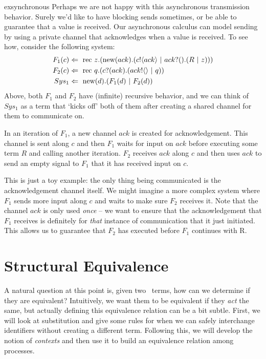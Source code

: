 \begin{example}{exsynchronous}
	 Perhaps we are not happy with this asynchronous transmission behavior.  Surely we'd like to have blocking sends sometimes, or be able to guarantee that a value is received.  Our asynchronous calculus can model  sending by using a private channel that acknowledges when a value is received.  To see how, consider the following system:
	\begin{align}
		F_1(c) & \Leftarrow\  \text{rec }{z}. (\text{new}({ack}).({c}!\langle{ack}\rangle \ |\  {ack}?({}).(R \ |\  z)))\\
		F_2(c) & \Leftarrow\  \text{rec }{q}. ({c}?({ack}).({ack}!\langle{}\rangle \ |\  q)) \\
		Sys_1 & \Leftarrow\  \text{new}({d}).(F_1(d) \ |\  F_2(d))
	\end{align}
	Above, both $F_1$ and $F_2$ have (infinite) recursive behavior, and we can think of $Sys_1$ as a term that `kicks off' both of them after creating a shared channel for them to communicate on.  
	
	In an iteration of $F_1$, a new channel $ack$ is created for acknowledgement.  This channel is sent along $c$ and then $F_1$ waits for input on $ack$ before executing some term $R$ and calling another iteration.  $F_2$ receives $ack$ along $c$ and then uses $ack$ to send an empty signal to $F_1$ that it has received input on $c$.  
	
	This is just a toy example: the only thing being communicated is the acknowledgement channel itself.  We might imagine a more complex system where $F_1$ sends more input along $c$ and waits to make sure $F_2$ receives it.  Note that the channel $ack$ is only used \emph{once} -- we want to ensure that the acknowledgement that $F_1$ receives is definitely for \emph{that} instance of communication that it just initiated.  This allows us to guarantee that $F_2$ has executed before $F_1$ continues with R.  \end{example}

\section{Structural Equivalence}
	A natural question at this point is, given two \picalc\ terms, how can we determine if they are equivalent?  Intuitively, we want them to be equivalent if they \emph{act} the same, but actually defining this equivalence relation can be a bit subtle.  First, we will look at substitution and give some rules for when we can safely interchange identifiers without creating a different term. Following this, we will develop the notion of \emph{contexts} and then use it to build an equivalence relation among processes.
